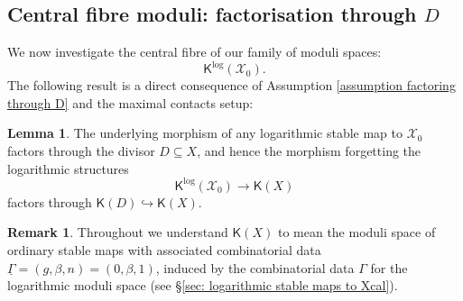 \documentclass[11pt]{amsart}
\theoremstyle{definition}
\theoremstyle{definition}
\newtheorem{lemma}[theorem]{Lemma}
\newtheorem{remark}[theorem]{Remark}
\newcommand{\Xcal}{\mathcal{X}}
\newcommand{\Kup}{\mathsf{K}}
\begin{document}
\subsection{Central fibre moduli: factorisation through $D$}\label{sec: central fibre moduli space} We now investigate the central fibre of our family of moduli spaces:
\begin{equation*} \Kup^{\log}(\Xcal_0). \end{equation*}
The following result is a direct consequence of Assumption \ref{assumption factoring through D} and the maximal contacts setup: 
\begin{lemma} \label{lem: factor through D} The underlying morphism of any logarithmic stable map to $\Xcal_0$ factors through the divisor $D \subseteq X$, and hence the morphism forgetting the logarithmic structures
\begin{equation*}\Kup^{\log}(\Xcal_0) \to \Kup(X)\end{equation*}
factors through $\Kup(D) \hookrightarrow \Kup(X)$.\end{lemma}

\begin{remark} Throughout we understand $\Kup(X)$ to mean the moduli space of ordinary stable maps with associated combinatorial data $\underline{\Gamma} = (g,\beta,n) = (0,\beta,1)$, induced by the combinatorial data $\Gamma$ for the logarithmic moduli space (see \S \ref{sec: logarithmic stable maps to Xcal}). \end{remark}
\end{document}
